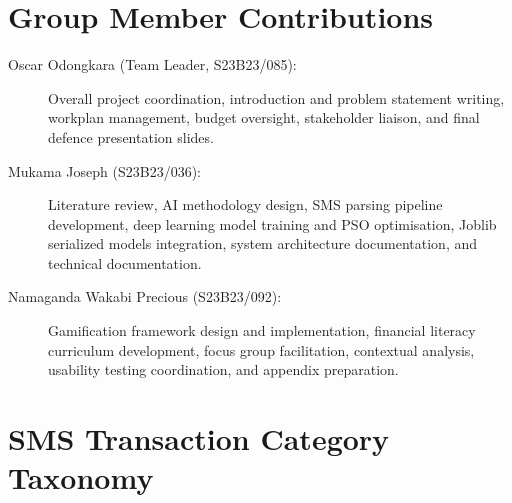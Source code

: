 \documentclass[12pt]{report}
\begin{document}

 




\appendix
{}
\begin{appendices}
    \chapter{Group Member Contributions}

\begin{description}
    \item[Oscar Odongkara (Team Leader, S23B23/085):] Overall project coordination, introduction and problem statement writing, workplan management, budget oversight, stakeholder liaison, and final defence presentation slides.
    \item[Mukama Joseph (S23B23/036):] Literature review, AI methodology design, SMS parsing pipeline development, deep learning model training and PSO optimisation, Joblib serialized models integration, system architecture documentation, and technical documentation.
    \item[Namaganda Wakabi Precious (S23B23/092):] Gamification framework design and implementation, financial literacy curriculum development, focus group facilitation, contextual analysis, usability testing coordination, and appendix preparation.
\end{description}

\chapter{SMS Transaction Category Taxonomy}


\end{appendices}
\end{document}

